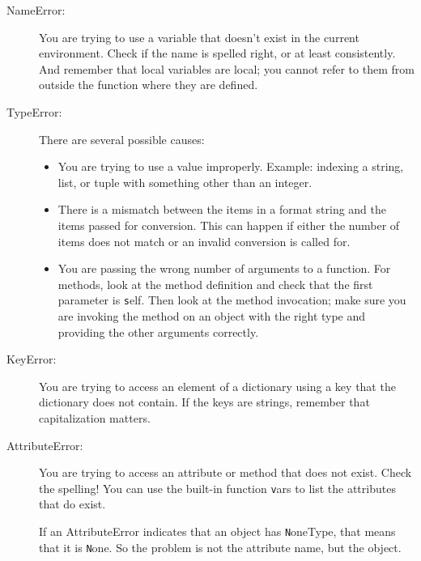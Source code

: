 \documentclass[
DIV=11,
fontsize=12,
twoside,
headinclude=false,
titlepage=firstiscover,
abstract=true,
headsepline=true,
footsepline=true,
chapterprefix=true, %
headings=big,
bibliography=totoc,%
captions=tableheading
]{scrbook}
\theoremstyle{definition}
\begin{document}
\begin{description}

\item[NameError:]  You are trying to use a variable that doesn't
exist in the current environment.  Check if the name
is spelled right, or at least consistently.
And remember that local variables are local; you
cannot refer to them from outside the function where they are defined.

\item[TypeError:] There are several possible causes:

\begin{itemize}

\item  You are trying to use a value improperly.  Example: indexing
a string, list, or tuple with something other than an integer.

\item There is a mismatch between the items in a format string and
the items passed for conversion.  This can happen if either the number
of items does not match or an invalid conversion is called for.

\item You are passing the wrong number of arguments to a function.
For methods, look at the method definition and
check that the first parameter is {\texttt self}.  Then look at the
method invocation; make sure you are invoking the method on an
object with the right type and providing the other arguments
correctly.

\end{itemize}

\item[KeyError:]  You are trying to access an element of a dictionary
using a key that the dictionary does not contain.  If the keys
are strings, remember that capitalization matters.

\item[AttributeError:] You are trying to access an attribute or method
  that does not exist.  Check the spelling!  You can use the built-in
  function {\texttt vars} to list the attributes that do exist.

If an AttributeError indicates that an object has {\texttt NoneType},
that means that it is {\texttt None}.  So the problem is not the
attribute name, but the object.


\end{description}
\end{document}
